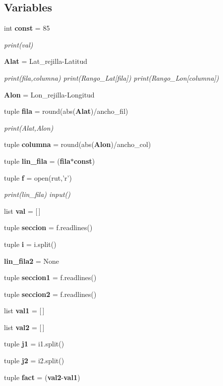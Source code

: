 \subsection*{Variables}
\begin{DoxyCompactItemize}
\item 
int {\bf const} = 85
\begin{DoxyCompactList}\small\item\em print(val) \end{DoxyCompactList}\item 
{\bf Alat} = Lat\-\_\-rejilla-\/Latitud
\begin{DoxyCompactList}\small\item\em print(fila,columna) print(\-Rango\-\_\-\-Lat[fila]) print(\-Rango\-\_\-\-Lon[columna]) \end{DoxyCompactList}\item 
{\bf Alon} = Lon\-\_\-rejilla-\/Longitud
\item 
tuple {\bf fila} = round(abs({\bf Alat})/ancho\-\_\-fil)
\begin{DoxyCompactList}\small\item\em print(\-Alat,\-Alon) \end{DoxyCompactList}\item 
tuple {\bf columna} = round(abs({\bf Alon})/ancho\-\_\-col)
\item 
tuple {\bf lin\-\_\-fila} = ({\bf fila}$\ast${\bf const})
\item 
tuple {\bf f} = open(rut,'r')
\begin{DoxyCompactList}\small\item\em print(lin\-\_\-fila) input() \end{DoxyCompactList}\item 
list {\bf val} = [$\,$]
\item 
tuple {\bf seccion} = f.\-readlines()
\item 
tuple {\bf i} = i.\-split()
\item 
{\bf lin\-\_\-fila2} = None
\item 
tuple {\bf seccion1} = f.\-readlines()
\item 
tuple {\bf seccion2} = f.\-readlines()
\item 
list {\bf val1} = [$\,$]
\item 
list {\bf val2} = [$\,$]
\item 
tuple {\bf j1} = i1.\-split()
\item 
tuple {\bf j2} = i2.\-split()
\item 
tuple {\bf fact} = ({\bf val2}-\/{\bf val1})

\end{DoxyCompactItemize}
